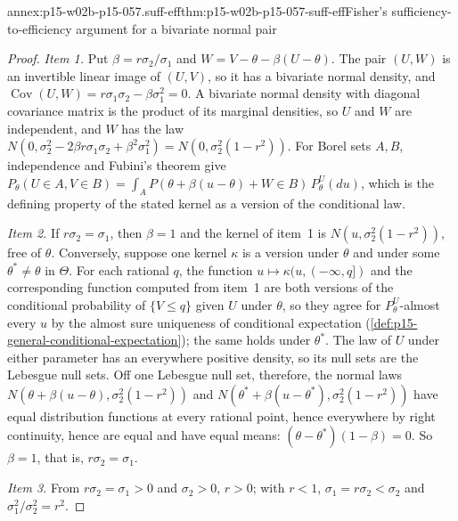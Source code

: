 \begin{annexitem}{annex:p15-w02b-p15-057.suff-eff}{thm:p15-w02b-p15-057-suff-eff}{Fisher's sufficiency-to-efficiency argument for a bivariate normal pair}
\begin{proof}
\emph{Item 1.} Put \(\beta=r\sigma_2/\sigma_1\) and
\(W=V-\theta-\beta(U-\theta)\). The pair \((U,W)\) is an invertible linear
image of \((U,V)\), so it has a bivariate normal density, and
\(\operatorname{Cov}(U,W)=r\sigma_1\sigma_2-\beta\sigma_1^2=0\). A
bivariate normal density with diagonal covariance matrix is the product
of its marginal densities, so \(U\) and \(W\) are independent, and \(W\)
has the law
\(N(0,\sigma_2^2-2\beta r\sigma_1\sigma_2+\beta^2\sigma_1^2)
=N(0,\sigma_2^2(1-r^2))\). For Borel sets \(A,B\), independence and
Fubini's theorem give
\(P_\theta(U\in A,V\in B)=\int_A P(\theta+\beta(u-\theta)+W\in B)\,
P_\theta^U(du)\), which is the defining property of the stated kernel as a
version of the conditional law.

\emph{Item 2.} If \(r\sigma_2=\sigma_1\), then \(\beta=1\) and the kernel of
item~1 is \(N(u,\sigma_2^2(1-r^2))\), free of \(\theta\). Conversely,
suppose one kernel \(\kappa\) is a version under \(\theta\) and under some
\(\theta^*\neq\theta\) in \(\Theta\). For each rational \(q\), the function
\(u\mapsto\kappa(u,(-\infty,q])\) and the corresponding function computed
from item~1 are both versions of the conditional probability of
\(\{V\leq q\}\) given \(U\) under \(\theta\), so they agree for
\(P_\theta^U\)-almost every \(u\) by the almost sure uniqueness of
conditional expectation (\cref{def:p15-general-conditional-expectation});
the same holds under \(\theta^*\). The law of \(U\) under either parameter
has an everywhere positive density, so its null sets are the Lebesgue null
sets. Off one Lebesgue null set, therefore, the normal laws
\(N(\theta+\beta(u-\theta),\sigma_2^2(1-r^2))\) and
\(N(\theta^*+\beta(u-\theta^*),\sigma_2^2(1-r^2))\) have equal
distribution functions at every rational point, hence everywhere by right
continuity, hence are equal and have equal means:
\((\theta-\theta^*)(1-\beta)=0\). So \(\beta=1\), that is,
\(r\sigma_2=\sigma_1\).

\emph{Item 3.} From \(r\sigma_2=\sigma_1>0\) and \(\sigma_2>0\), \(r>0\);
with \(r<1\), \(\sigma_1=r\sigma_2<\sigma_2\) and
\(\sigma_1^2/\sigma_2^2=r^2\).
\end{proof}
\end{annexitem}

